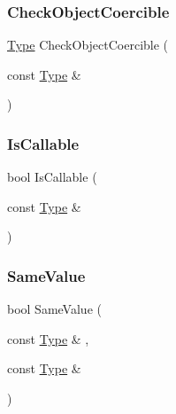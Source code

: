 \mbox{\label{class_type_aa64e7c736bb488746fa28a526d381f53}} 
\subsubsection{\texorpdfstring{Check\+Object\+Coercible}{CheckObjectCoercible}}
{\footnotesize\ttfamily \hyperlink{class_type}{Type} Check\+Object\+Coercible (\begin{DoxyParamCaption}\item[{const \hyperlink{class_type}{Type} \&}]{ }\end{DoxyParamCaption})\hspace{0.3cm}{\ttfamily [friend]}}

\mbox{\label{class_type_a891f7c233613f70b05bc4f9403498c8e}} 
\subsubsection{\texorpdfstring{Is\+Callable}{IsCallable}}
{\footnotesize\ttfamily bool Is\+Callable (\begin{DoxyParamCaption}\item[{const \hyperlink{class_type}{Type} \&}]{ }\end{DoxyParamCaption})\hspace{0.3cm}{\ttfamily [friend]}}

\mbox{\label{class_type_a9970cda2e5a3a4beab27346bf77ec13d}} 
\subsubsection{\texorpdfstring{Same\+Value}{SameValue}}
{\footnotesize\ttfamily bool Same\+Value (\begin{DoxyParamCaption}\item[{const \hyperlink{class_type}{Type} \&}]{,  }\item[{const \hyperlink{class_type}{Type} \&}]{ }\end{DoxyParamCaption})\hspace{0.3cm}{\ttfamily [friend]}}

